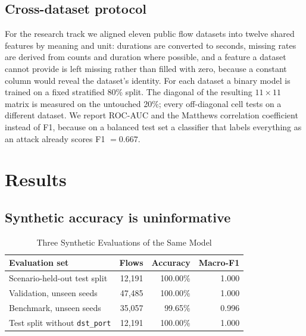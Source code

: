\documentclass[conference]{IEEEtran}
\begin{document}
\subsection{Cross-dataset protocol}\label{sec:sfaf}
For the research track we aligned eleven public flow datasets
\cite{sharafaldin2018cicids2017,moustafa2015unswnb15,alsaedi2020toniot,
koroniotis2019botiot,neto2023ciciot2023,sharafaldin2019cicddos2019,
ullah2020iotid20,alhawawreh2022xiiotid,hindy2021mqtt,zolanvari2021wustl,
garcia2020iot23}
into twelve shared features by meaning and unit: durations are converted to
seconds, missing rates are derived from counts and duration where possible,
and a feature a dataset cannot provide is left missing rather than filled
with zero, because a constant column would reveal the dataset's identity.
For each dataset a binary model is trained on a fixed stratified 80\% split.
The diagonal of the resulting $11\times 11$ matrix is measured on the
untouched 20\%; every off-diagonal cell tests on a different dataset. We
report ROC-AUC and the Matthews correlation coefficient instead of F1,
because on a balanced test set a classifier that labels everything as an
attack already scores F1 $=0.667$.

\section{Results}\label{sec:results}

\subsection{Synthetic accuracy is uninformative}

\begin{table}[t]
\caption{Three Synthetic Evaluations of the Same Model}
\label{tab:synthetic}
\centering
\begin{tabular}{@{}lrrr@{}}
\toprule
Evaluation set & Flows & Accuracy & Macro-F1 \\
\midrule
Scenario-held-out test split & 12{,}191 & 100.00\% & 1.000 \\
Validation, unseen seeds     & 47{,}485 & 100.00\% & 1.000 \\
Benchmark, unseen seeds      & 35{,}057 & 99.65\%  & 0.996 \\
\midrule
Test split without \texttt{dst\_port} & 12{,}191 & 100.00\% & 1.000 \\
\bottomrule
\end{tabular}
\end{table}
\end{document}

